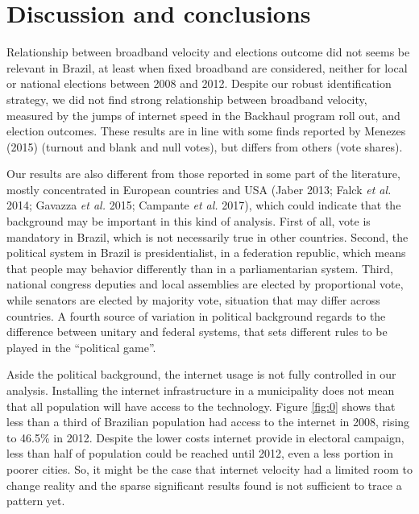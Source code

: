 \documentclass[
  12pt,
]{article}
\begin{document}
\hypertarget{discussion-and-conclusions}{%
\section{Discussion and conclusions}\label{discussion-and-conclusions}}

Relationship between broadband velocity and elections outcome did not
seems be relevant in Brazil, at least when fixed broadband are
considered, neither for local or national elections between 2008 and
2012. Despite our robust identification strategy, we did not find strong
relationship between broadband velocity, measured by the jumps of
internet speed in the Backhaul program roll out, and election outcomes.
These results are in line with some finds reported by Menezes (2015)
(turnout and blank and null votes), but differs from others (vote
shares).

Our results are also different from those reported in some part of the
literature, mostly concentrated in European countries and USA (Jaber
2013; Falck \emph{et al.} 2014; Gavazza \emph{et al.} 2015; Campante
\emph{et al.} 2017), which could indicate that the background may be
important in this kind of analysis. First of all, vote is mandatory in
Brazil, which is not necessarily true in other countries. Second, the
political system in Brazil is presidentialist, in a federation republic,
which means that people may behavior differently than in a
parliamentarian system. Third, national congress deputies and local
assemblies are elected by proportional vote, while senators are elected
by majority vote, situation that may differ across countries. A fourth
source of variation in political background regards to the difference
between unitary and federal systems, that sets different rules to be
played in the ``political game''.

Aside the political background, the internet usage is not fully
controlled in our analysis. Installing the internet infrastructure in a
municipality does not mean that all population will have access to the
technology. Figure \ref{fig:0} shows that less than a third of Brazilian
population had access to the internet in 2008, rising to 46.5\% in 2012.
Despite the lower costs internet provide in electoral campaign, less
than half of population could be reached until 2012, even a less portion
in poorer cities. So, it might be the case that internet velocity had a
limited room to change reality and the sparse significant results found
is not sufficient to trace a pattern yet.
\end{document}
